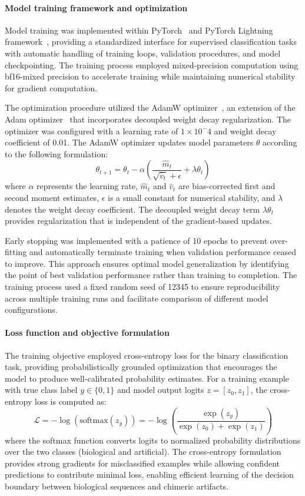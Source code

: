 \documentclass[pdflatex,sn-nature]{sn-jnl}%
\theoremstyle{thmstyleone}%
\theoremstyle{thmstyletwo}%
\theoremstyle{thmstylethree}%
\begin{document}
\paragraph{Model training framework and optimization}
Model training was implemented within PyTorch~\cite{paszke2019pytorch} and PyTorch Lightning framework~\cite{Falcon_PyTorch_Lightning_2019}, providing a standardized interface for supervised classification tasks with automatic handling of training loops, validation procedures, and model checkpointing.
The training process employed mixed-precision computation using bf16-mixed precision to accelerate training while maintaining numerical stability for gradient computation.

The optimization procedure utilized the AdamW optimizer~\cite{adamw}, an extension of the Adam optimizer~\cite{kingma2014adam} that incorporates decoupled weight decay regularization.
The optimizer was configured with a learning rate of $1\times10^-4$ and weight decay coefficient of 0.01.
The AdamW optimizer updates model parameters $\theta$ according to the following formulation:
$$
	\theta_{t+1} = \theta_t - \alpha \left( \frac{\hat{m}_t}{\sqrt{\hat{v}_t} + \epsilon} + \lambda \theta_t \right)
$$
where $\alpha$ represents the learning rate, $\hat{m}_t$ and $\hat{v}_t$ are bias-corrected first and second moment estimates, $\epsilon$ is a small constant for numerical stability, and $\lambda$ denotes the weight decay coefficient.
The decoupled weight decay term $\lambda \theta_t$ provides regularization that is independent of the gradient-based updates.

Early stopping was implemented with a patience of 10 epochs to prevent over-fitting and automatically terminate training when validation performance ceased to improve.
This approach ensures optimal model generalization by identifying the point of best validation performance rather than training to completion.
The training process used a fixed random seed of 12345 to ensure reproducibility across multiple training runs and facilitate comparison of different model configurations.

\paragraph{Loss function and objective formulation}
The training objective employed cross-entropy loss for the binary classification task, providing probabilistically grounded optimization that encourages the model to produce well-calibrated probability estimates.
For a training example with true class label $y \in \{0,1\}$ and model output logits $z = [z_0, z_1]$, the cross-entropy loss is computed as:
$$
	\mathcal{L} = -\log(\textrm{softmax}(z_y)) = -\log\left(\frac{\exp(z_y)}{\exp(z_0) + \exp(z_1)}\right)
$$
where the softmax function converts logits to normalized probability distributions over the two classes (biological and artificial).
The cross-entropy formulation provides strong gradients for misclassified examples while allowing confident predictions to contribute minimal loss, enabling efficient learning of the decision boundary between biological sequences and chimeric artifacts.
\end{document}
